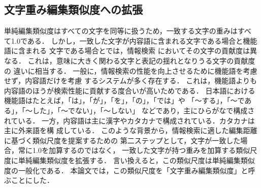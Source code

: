 \subsection{文字重み編集類似度への拡張} 

単純編集類似度はすべての文字を同等に扱うため，一致する文字の重みはすべ
て1.0である．
しかし，一致した文字が内容語に含まれる文字である場合と機能語に含まれる
文字である場合とでは，情報検索
においてその文字の貢献度は異なる．
これは，意味に大きく関わる文字と表記の揺れとなりうる文字の貢献度の
違いに相当する．
一般に，情報検索の性能を向上させるために機能語を考慮せず，内容語だけを考慮
するシステムが多く存在する．
これは，機能語よりも内容語のほうが検索性能に貢献する度合いが高いためである．
日本語における機能語はたとえば，「は」，「が」，「を」，「の」，「では」や
「〜する」，「〜である」，「〜した」，「〜でない」，「〜しない」
などであり，主にひらがなで構成されている．
一方，内容語は主に漢字やカタカナで構成されている．カタカナは主に外来語を構
成している．
このような背景から，情報検索に適した編集距離に基づく類似尺度を提案するための
第二ステップとして，文字が一致した場合，常に1.0を加算するのではなく，
一致した文字が持つ重みを加算する類似尺度に単純編集類似度を拡張する．
言い換えると，この類似尺度は単純編集類似度の一般化である．
本論文では，この類似尺度を「文字重み編集類似度」と呼ぶことにした．

